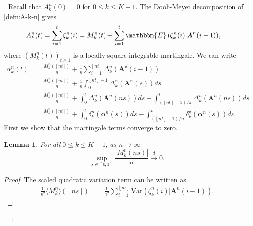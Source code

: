 \documentclass[11pt,a4paper, reqno]{article}
\newtheorem{lemma}[theorem]{Lemma}
\begin{document}
\begin{proof}[\nopunct]
Recall that $A_k^n(0)=0$ for $0\leq k\leq K-1$. The Doob-Meyer decomposition of \eqref{defn:A-k-n} gives
\begin{equation}
\begin{split}
 A_k^n(t)&=\sum_{i=1}^t\zeta_k^n(i)=M_k^n(t)+\sum_{i=1}^t{\mathbbm{E}\left({\zeta_k^n(i)|{\ensuremath{\boldsymbol{{A}}}}^n(i-1)}\right)},
 \end{split}
\end{equation}where $(M_k^n(t))_{t\geq 1}$ is a locally square-integrable martingale. We can write
\begin{equation}\label{eq:mart-decompose}
 \begin{split}
  \alpha_k^n(t)&=\frac{M_k^n({\ensuremath{\left\lfloor {nt} \right\rfloor}})}{n}+\frac{1}{n}\sum_{i=1}^{{\ensuremath{\left\lfloor {nt} \right\rfloor}}}\Delta_k^n({\ensuremath{\boldsymbol{{A}}}}^n(i-1))\\
  &=\frac{M_k^n({\ensuremath{\left\lfloor {nt} \right\rfloor}})}{n}+\frac{1}{n}\int_0^{{\ensuremath{\left\lfloor {nt} \right\rfloor}}-1}\Delta_k^n({\ensuremath{\boldsymbol{{A}}}}^n(s))ds\\
  &=\frac{M_k^n({\ensuremath{\left\lfloor {nt} \right\rfloor}})}{n}+\int_0^{t}\Delta_k^n({\ensuremath{\boldsymbol{{A}}}}^n(ns))ds-\int_{({\ensuremath{\left\lfloor {nt} \right\rfloor}}-1)/n}^t\Delta_k^n({\ensuremath{\boldsymbol{{A}}}}^n(ns))ds\\
  &= \frac{M_k^n({\ensuremath{\left\lfloor {nt} \right\rfloor}})}{n}+\int_0^{t}\delta_k^n({\ensuremath{\boldsymbol{{\alpha}}}}^n(s))ds-\int_{({\ensuremath{\left\lfloor {nt} \right\rfloor}}-1)/n}^t\delta_k^n({\ensuremath{\boldsymbol{{\alpha}}}}^n(s))ds.
 \end{split}
\end{equation}
First we show that the martingale terms converge to zero. \begin{lemma}\label{lem:conv-mart}For all $0\leq k\leq K-1$, as $n\to\infty$
\begin{equation}\label{eq:mart-conv}
\sup_{s\in [0,1]}\frac{|M_k^n(ns)|}{n}{\ensuremath{\xrightarrow{d}}} 0.
\end{equation}
\end{lemma}
\begin{proof}
The scaled quadratic variation term can be written as
 \begin{equation}\label{expr:qv}
  \begin{split}
  \frac{1}{n^2}\langle M_k^n \rangle({\ensuremath{\left\lfloor {ns} \right\rfloor}})&=\frac{1}{n^2}\sum_{i=1}^{{\ensuremath{\left\lfloor {ns} \right\rfloor}}}{\ensuremath{\mathrm{Var}\left({\zeta_k^n(i)|{\ensuremath{\boldsymbol{{A}}}}^n(i-1)}\right)}}.

\end{split}
\end{equation}
\end{proof}
\end{proof}
\end{document}
